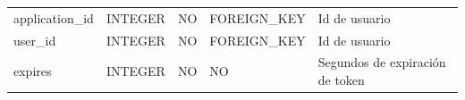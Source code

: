 \documentclass[12pt,a4paperpaper,]{report}
\begin{document}
\begin{longtable}[]{@{}lllll@{}}
\begin{minipage}[t]{0.21\columnwidth}\raggedright\strut
application\_id\strut
\end{minipage} & \begin{minipage}[t]{0.19\columnwidth}\raggedright\strut
INTEGER\strut
\end{minipage} & \begin{minipage}[t]{0.16\columnwidth}\raggedright\strut
NO\strut
\end{minipage} & \begin{minipage}[t]{0.19\columnwidth}\raggedright\strut
FOREIGN\_KEY\strut
\end{minipage} & \begin{minipage}[t]{0.11\columnwidth}\raggedright\strut
Id de usuario\strut
\end{minipage}\tabularnewline
\begin{minipage}[t]{0.21\columnwidth}\raggedright\strut
user\_id\strut
\end{minipage} & \begin{minipage}[t]{0.19\columnwidth}\raggedright\strut
INTEGER\strut
\end{minipage} & \begin{minipage}[t]{0.16\columnwidth}\raggedright\strut
NO\strut
\end{minipage} & \begin{minipage}[t]{0.19\columnwidth}\raggedright\strut
FOREIGN\_KEY\strut
\end{minipage} & \begin{minipage}[t]{0.11\columnwidth}\raggedright\strut
Id de usuario\strut
\end{minipage}\tabularnewline
\begin{minipage}[t]{0.21\columnwidth}\raggedright\strut
expires\strut
\end{minipage} & \begin{minipage}[t]{0.19\columnwidth}\raggedright\strut
INTEGER\strut
\end{minipage} & \begin{minipage}[t]{0.16\columnwidth}\raggedright\strut
NO\strut
\end{minipage} & \begin{minipage}[t]{0.19\columnwidth}\raggedright\strut
NO\strut
\end{minipage} & \begin{minipage}[t]{0.11\columnwidth}\raggedright\strut
Segundos de expiración de token\strut
\end{minipage}\tabularnewline
\bottomrule
\end{longtable}
\end{document}
